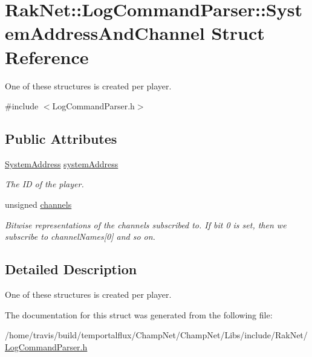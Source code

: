 \hypertarget{struct_rak_net_1_1_log_command_parser_1_1_system_address_and_channel}{\section{Rak\-Net\-:\-:Log\-Command\-Parser\-:\-:System\-Address\-And\-Channel Struct Reference}
\label{struct_rak_net_1_1_log_command_parser_1_1_system_address_and_channel}
}


One of these structures is created per player.  




{\ttfamily \#include $<$Log\-Command\-Parser.\-h$>$}

\subsection*{Public Attributes}
\begin{DoxyCompactItemize}
\item 
\hypertarget{struct_rak_net_1_1_log_command_parser_1_1_system_address_and_channel_a4b42f0650c926861ebb3d86f781a2b34}{\hyperlink{struct_rak_net_1_1_system_address}{System\-Address} \hyperlink{struct_rak_net_1_1_log_command_parser_1_1_system_address_and_channel_a4b42f0650c926861ebb3d86f781a2b34}{system\-Address}}\label{struct_rak_net_1_1_log_command_parser_1_1_system_address_and_channel_a4b42f0650c926861ebb3d86f781a2b34}

\begin{DoxyCompactList}\small\item\em The I\-D of the player. \end{DoxyCompactList}\item 
\hypertarget{struct_rak_net_1_1_log_command_parser_1_1_system_address_and_channel_a97a55f1f57203660c24122d97df584c2}{unsigned \hyperlink{struct_rak_net_1_1_log_command_parser_1_1_system_address_and_channel_a97a55f1f57203660c24122d97df584c2}{channels}}\label{struct_rak_net_1_1_log_command_parser_1_1_system_address_and_channel_a97a55f1f57203660c24122d97df584c2}

\begin{DoxyCompactList}\small\item\em Bitwise representations of the channels subscribed to. If bit 0 is set, then we subscribe to channel\-Names\mbox{[}0\mbox{]} and so on. \end{DoxyCompactList}\end{DoxyCompactItemize}


\subsection{Detailed Description}
One of these structures is created per player. 

The documentation for this struct was generated from the following file\-:\begin{DoxyCompactItemize}
\item 
/home/travis/build/temportalflux/\-Champ\-Net/\-Champ\-Net/\-Libs/include/\-Rak\-Net/\hyperlink{_log_command_parser_8h}{Log\-Command\-Parser.\-h}\end{DoxyCompactItemize}

